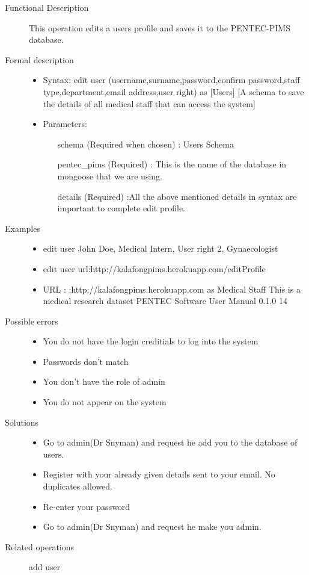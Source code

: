 \documentclass[14pt, a4paper]{article}
\begin{document}
\begin{description}
\item[Functional Description] This operation edits a users profile and saves it to the PENTEC-PIMS database.
\item[Formal description]\hfill
\begin{itemize}
	\item Syntax: edit user (username,surname,password,confirm password,staff type,department,email address,user right) as [Users] [A schema to save the details of all medical staff that can access the system]\\
	\item Parameters:
		\begin{itemize}
			\item [schema] (Required when chosen) : Users Schema
			\item [pentec\_pims] (Required) : This is the name of the database in mongoose that we are using.
			\item [details] (Required) :All the above mentioned details in syntax are important to complete edit profile.
		\end{itemize}
\end{itemize}

\item[Examples]\hfill
\begin{itemize}
	\item edit user John Doe, Medical Intern, User right 2, Gynaecologist
	\item edit user url:http://kalafongpims.herokuapp.com/editProfile
	\item URL : :http://kalafongpims.herokuapp.com as Medical Staff This is a medical research dataset PENTEC Software User Manual 0.1.0 14
\end{itemize}

\item[Possible errors]\hfill
\begin{itemize}
	\item You do not have the login creditials to log into the system
	\item Passwords don't match
	\item You don't have the role of admin
	\item You do not appear on the system
\end{itemize}

\item[Solutions]\hfill
\begin{itemize}
	\item Go to admin(Dr Snyman) and request he add you to the database of users.
	\item Register with your already given details sent to your email. No duplicates allowed.
	\item Re-enter your password
	\item  Go to admin(Dr Snyman) and request he make you admin.
\end{itemize}
\item[Related operations] add user
\end{description}
		   
\end{document}
